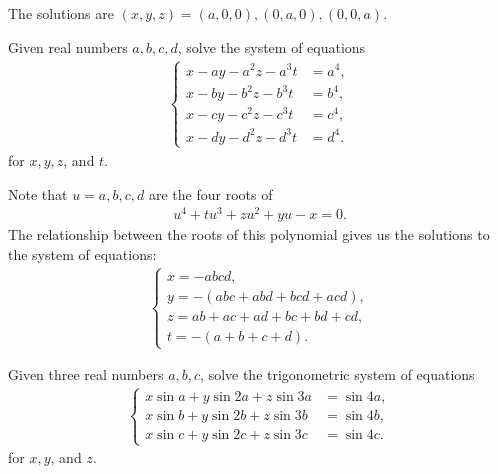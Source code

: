 \documentclass[12pt,a4paper]{memoir}
\theoremstyle{definition}
\begin{document}
\begin{solution}
	The solutions are $(x,y,z)=(a,0,0), (0,a,0), (0,0,a)$.
\end{solution}


\begin{question}\label{p:sys-eq-H}
	Given real numbers $a,b,c,d$, solve the system of equations
	\begin{align*}
		\begin{cases}
			x-ay-a^2z-a^3t &=a^4,\\x-by-b^2z-b^3t &=b^4,\\x-cy-c^2z-c^3t &=c^4,\\x-dy-d^2z-d^3t &=d^4.
		\end{cases}
	\end{align*}
	for $x,y,z$, and $t$.
\end{question}

\begin{solution}
	Note that $u=a,b,c,d$ are the four roots of
	\begin{align*}
		u^4+tu^3+zu^2+yu-x=0.
	\end{align*}
	The relationship between the roots of this polynomial gives us the solutions to the system of equations:
	\begin{align*}
		\begin{cases}
			x=-abcd,\\y=-(abc+abd+bcd+acd),\\z=ab+ac+ad+bc+bd+cd,\\t=-(a+b+c+d).
		\end{cases}
	\end{align*}
\end{solution}


\begin{question}\label{p:sys-eq-I}
	Given three real numbers $a,b,c$, solve the trigonometric system of equations
	\begin{align*}
		\begin{cases}
			x\sin a + y\sin 2a + z\sin 3a &= \sin 4a,\\ x\sin b + y\sin 2b + z\sin 3b &= \sin 4b,\\ x\sin c + y\sin 2c + z\sin 3c &= \sin 4c.
		\end{cases}
	\end{align*}
	for $x,y$, and $z$.
\end{question}
\end{document}
